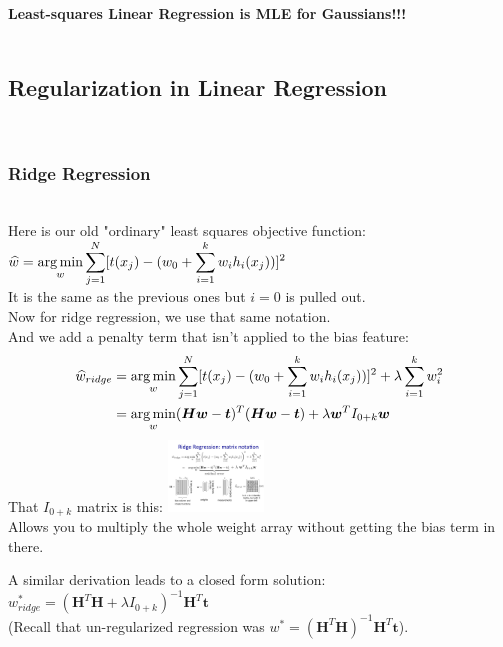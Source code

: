 \textbf{Least-squares Linear Regression is MLE for Gaussians!!!}  \hfill \\ \hfill \\

\subsection{Regularization in Linear Regression}  \hfill \\

\subsubsection{Ridge Regression}  \hfill \\
Here is our old "ordinary" least squares objective function:   \hfill \\
$\displaystyle \widehat{w} = \operatorname*{arg\,min}_w \sum_{j=1}^N [t(x_j) - (w_0 + \sum_{i=1}^k w_i h_i(x_j))]^2$   \hfill \\
It is the same as the previous ones but $i=0$ is pulled out.    \hfill \\
Now for ridge regression, we use that same notation.  \hfill \\
And we add a penalty term that isn't applied to the bias feature:
\begin{align*}
	\widehat{w}_{ridge} &= \operatorname*{arg\,min}_w \sum_{j=1}^N [t(x_j) - (w_0 + \sum_{i=1}^k w_i h_i(x_j))]^2 + \lambda \sum_{i=1}^k w_i^2   \\
	&= \operatorname*{arg\,min}_w (\bm{H}\bm{w} - \bm{t})^T(\bm{H}\bm{w}-\bm{t}) + \lambda \bm{w}^T I_{0+k} \bm{w}
\end{align*}
That $I_{0+k}$ matrix is this: 
\includegraphics[width=1.0in]{figures/ridge_identity_matrix_with_zero.pdf}  \hfill \\
Allows you to multiply the whole weight array without getting the bias term in there. 

A similar derivation leads to a closed form solution:  \hfill \\
$w_{ridge}^* = (\bm{H}^T\bm{H} + \lambda I_{0+k})^{-1}\bm{H}^T\bm{t}$ \hfill \\
(Recall that un-regularized regression was $w^* = (\bm{H}^T\bm{H})^{-1}\bm{H}^T\bm{t}$).  \hfill \\   \hfill \\

